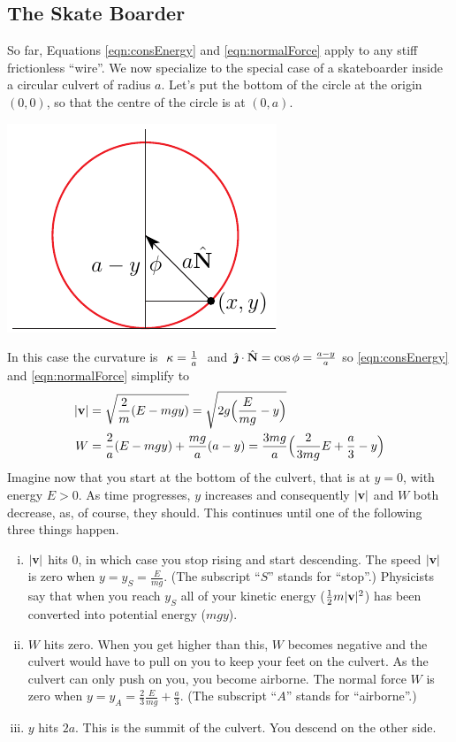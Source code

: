 \subsection*{The Skate Boarder}
So far, Equations \eqref{eqn:consEnergy} and \eqref{eqn:normalForce} 
apply to any stiff frictionless ``wire''. We now 
specialize  to the special case of a skateboarder inside a circular culvert 
of radius $a$. Let's put the bottom of the circle at the origin $(0,0)$,
so that the centre of the circle is at $(0,a)$.

\begin{efig}
\begin{center}
    \includegraphics{circleC2.pdf}
\end{center}
\end{efig}
\noindent
In this case the curvature is $\ \ka=\frac{1}{a}\ $
and
$
\hat{\pmb{\jmath}}\cdot\hat{\mathbf{N}}=\cos \phi=\frac{a-y}{a}
$
so \eqref{eqn:consEnergy} and \eqref{eqn:normalForce}  simplify to
\begin{align*}
|\mathbf{v}|&=\sqrt{\frac{2}{m}(E-mgy)}=\sqrt{2g\Big(\frac{E}{mg}-y\Big)}
\\
W&=\frac{2}{a}(E-mgy)+\frac{mg}{a}(a-y)
=\frac{3mg}{a}\Big(\frac{2}{3mg}E+\frac{a}{3}-y\Big)
\end{align*}
Imagine now that you start at the bottom of the culvert, that is at $y=0$,
with energy $E>0$. As time progresses, $y$ increases and consequently $|\mathbf{v}|$
and $W$ both decrease, as, of course, they should. This continues until one of the following three things happen.
\begin{enumerate}[(i)]
\item 
$|\mathbf{v}|$ hits 0, in which case you stop rising and start descending. 
The speed $|\mathbf{v}|$ is zero when $y=y_S=\frac{E}{mg}$.
(The subscript ``$S$'' stands for ``stop''.) Physicists say that 
when you reach $y_S$ all of your kinetic energy ($\frac{1}{2}m|\mathbf{v}|^2$)
has been converted into potential energy ($mgy$). 

\item
$W$ hits zero. When you get higher than this, $W$ becomes negative 
and the culvert would have to pull on you to keep your feet on the culvert. 
As the culvert can only push on you, you become airborne. The normal force 
$W$ is zero  when $y=y_A=\frac{2}{3}\frac{E}{mg}+\frac{a}{3}$.
(The subscript ``$A$'' stands for ``airborne''.)

\item
$y$ hits $2a$. This is the summit of the culvert. You descend on the other side.
\end{enumerate}
